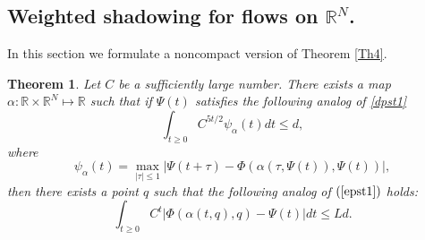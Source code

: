 \documentclass[11pt]{article}
\newcounter{razdel}[section]
\theoremstyle{Mystyle}
\newtheorem{Theorem}[razdel]{Theorem}
\begin{document}
\subsection{Weighted shadowing for flows on $\mathbb{R}^{N}$.}

In this section we formulate a noncompact version of Theorem \ref{Th4}.


\begin{Theorem}
\label{Th6}
Let $C$ be a sufficiently large number. There exists a map $\alpha:\mathbb{R}\times\mathbb{R}^N\mapsto\mathbb{R}$ such that if $\Psi(t)$ satisfies the following analog of \eqref{dpst1}
\begin{equation}
\label{dpstlast}
\int_{t\geq 0} C^{5t/2}\psi_{\alpha}(t) dt\leq d,
\end{equation}
where 
$$\psi_{\alpha}(t) = \max_{|\tau|\leq 1} |\Psi(t+\tau) - \Phi(\alpha(\tau,\Psi(t)),\Psi(t))|,$$
 then there exists a point $q$ such that the following analog of $(\ref{epst1})$ holds:
\begin{equation}
\label{epstlast}
\int_{t\geq 0} C^{t}|\Phi(\alpha(t,q),q) - \Psi(t)|dt\leq Ld.
\end{equation}
\end{Theorem}
\end{document}
